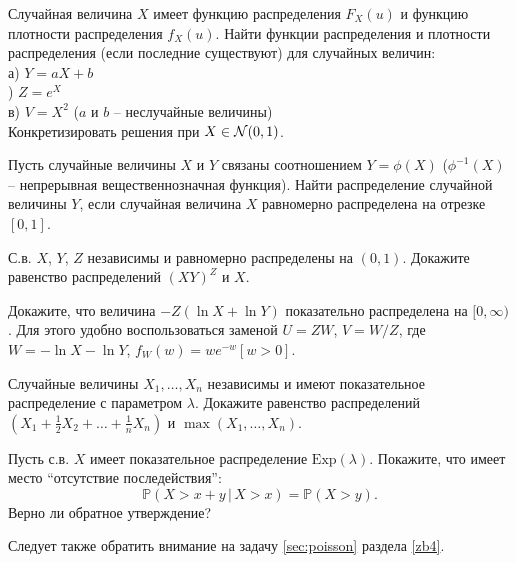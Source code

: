 \begin{problem}
Случайная величина $X$ имеет функцию распределения $F_X(u)$ и функцию плотности распределения $f_X(u)$. Найти функции распределения и плотности распределения (если последние существуют) для случайных величин:\\
\indent а) $Y = aX+b$\\
) $Z =e^X$\\
\indent в) $V = X^2$ ($a$ и $b$ – неслучайные величины)\\
Конкретизировать решения при $X \in \mathcal{N}(0,1)$.
\end{problem}

\begin{problem}
Пусть случайные величины $X$ и $Y$ связаны соотношением $Y = \phi(X)$ ($\phi^{-1}(X)$ – непрерывная вещественнозначная функция). Найти распределение случайной величины $Y$, если случайная величина $X$ равномерно распределена на отрезке $[0,1]$.
\end{problem}

\begin{problem}
С.в. $X$, $Y$, $Z$ независимы и равномерно распределены на $(0,1)$. Докажите равенство распределений  $(XY)^{Z}$  и $X$.
\end{problem}

\begin{ordre}
Докажите, что величина $-Z(\ln X + \ln Y)$ показательно распределена на $[0,\infty)$. Для этого удобно воспользоваться заменой $U = Z W$, $V = W/Z$, где $W = - \ln X - \ln Y$, $f_W(w) = w e^{-w} [w>0]$. 
\end{ordre}

\begin{problem}
Случайные величины $X_1,\ldots,X_n$ независимы и имеют показательное распределение с параметром $\lambda$.
Докажите равенство распределений $(X_1+  \frac{1}{2} X_2 + \ldots+ \frac{1}{n} X_n)$ и  $\max(X_1,\ldots,X_n)$.
\end{problem}

\begin{problem}
\label{exp_eps}
Пусть с.в. $X$ имеет показательное распределение $\mathrm{Exp}(\lambda)$. Покажите, что имеет место ``отсутствие последействия'': 
$$
{\mathbb P}(X>x+y\,|\, X>x)={\mathbb P}(X>y) . 
$$
Верно ли обратное утверждение?
\end{problem}
\begin{remark}
Следует также обратить внимание на задачу \ref{sec:poisson} раздела \ref{zb4}.
\end{remark}

